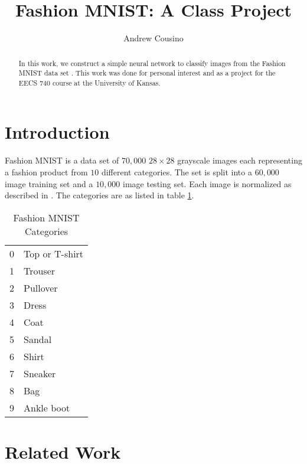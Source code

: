 \documentclass{IEEEtran}
\title{Fashion MNIST: A Class Project}
\author{Andrew Cousino}
\begin{document}
\maketitle

\begin{abstract}
In this work, we construct a simple neural network to classify images from the
Fashion MNIST data set \cite{xiao2017fashionmnist}. This work was done for
personal interest and as a project for the EECS 740 course at the University
of Kansas.
\end{abstract}

\section{Introduction}
Fashion MNIST \cite{xiao2017fashionmnist} is a data set of \(70,000\)
\(28\times 28\) grayscale images each representing a fashion product from 
\(10\) different categories. The set is split into a \(60,000\) image training
set and a \(10,000\) image testing set. Each image is normalized as described in
\cite{xiao2017fashionmnist}. The categories are as listed in table
\ref{table:categories}.

\begin{table}[h]
    \centering
    \begin{tabular}{rl}
        0 & Top or T-shirt \\
        1 & Trouser \\
        2 & Pullover \\
        3 & Dress \\
        4 & Coat \\
        5 & Sandal \\
        6 & Shirt \\
        7 & Sneaker \\
        8 & Bag \\
        9 & Ankle boot \\
    \end{tabular}
    \caption{Fashion MNIST Categories}
    \label{table:categories}
\end{table}

\section{Related Work}


\end{document}
